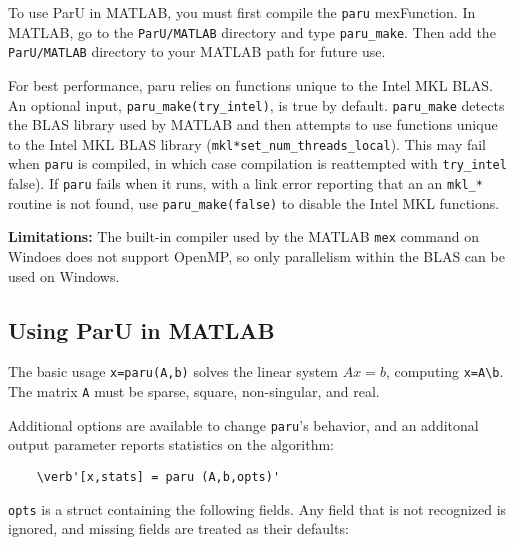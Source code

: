 \documentclass[12pt]{article}
\begin{document}
To use ParU in MATLAB, you must first compile the \verb'paru' mexFunction.
In MATLAB, go to the \verb'ParU/MATLAB' directory and type \verb'paru_make'.
Then add the \verb'ParU/MATLAB' directory to your MATLAB path for future use.

For best performance, paru relies on functions unique to the Intel MKL BLAS.
An optional input, \verb'paru_make(try_intel)', is true by default.
\verb'paru_make' detects the BLAS library used by MATLAB and then attempts to
use functions unique to the Intel MKL BLAS library
(\verb'mkl*set_num_threads_local').  This may fail when \verb'paru' is
compiled, in which case compilation is reattempted with \verb'try_intel'
false).  If \verb'paru' fails when it runs, with a link error reporting that an
an \verb'mkl_*' routine is not found, use \verb'paru_make(false)' to disable
the Intel MKL functions.

{\bf Limitations:}
The built-in compiler used by the MATLAB \verb'mex' command on Windoes does not
support OpenMP, so only parallelism within the BLAS can be used on Windows.

\subsection{Using ParU in MATLAB}

The basic usage \verb'x=paru(A,b)' solves the linear system $Ax=b$, computing
\verb'x=A\b'.  The matrix \verb'A' must be sparse, square, non-singular, and
real.

Additional options are available to change \verb'paru''s behavior, and
an additonal output parameter reports statistics on the algorithm:

    \begin{verbatim}
    \verb'[x,stats] = paru (A,b,opts)'
    \end{verbatim}

\verb'opts' is a struct containing the following fields.  Any field that is not
recognized is ignored, and missing fields are treated as their defaults:
\end{document}

